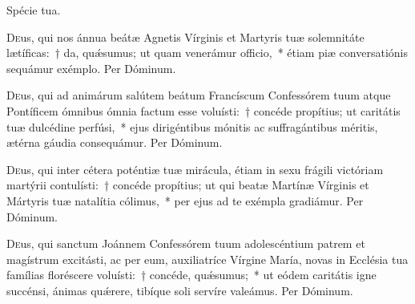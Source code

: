 \documentclass[vesperale_romanum.tex]{subfiles}
\begin{document}
\vv Spécie tua.

\oratio

 \lettrine{D}{e}us, qui nos ánnua beátæ Agnetis Vírginis et Martyris tuæ sole\-mnitáte lætíficas:~† da, quǽsumus; ut quam venerámur officio,~* étiam piæ conversatiónis sequámur exémplo.
Per Dóminum.

\capitdeseq

\myrule


\duplexmtv


\oratio

\lettrine{D}{e}us, qui ad animárum salútem beátum Francíscum Confessórem tuum atque Pontíficem ómnibus ómnia factum esse voluísti:~† concéde propítius; ut caritátis tuæ dulcédine perfúsi,~* ejus dirigéntibus mónitis ac suffragántibus méritis, ætérna gáudia consequámur.
Per Dóminum.


\commsequentis

\myrule


\semiduplex


\oratio

\lettrine{D}{e}us, qui inter cétera poténtiæ tuæ mirácula, étiam in sexu frágili vi\-ctóriam martýrii contulísti:~† concéde propítius; ut qui beatæ Martínæ Vírginis et Mártyris tuæ natalítia cólimus,~* per ejus ad te exémpla gradiámur. Per Dóminum.





\vespsequentiscomm

\myrule
\newpage


\duplex

\oratio

\lettrine{D}{e}us, qui sanctum Joánnem Confessórem tuum adolescéntium patrem et magístrum excitásti, ac per eum, auxiliatríce Vírgine María, novas in Ecclésia tua famílias floréscere voluísti:~† concéde, quǽsumus;~* ut eódem caritátis igne succénsi, ánimas quǽrere, tibíque soli servíre valeámus.
Per Dóminum.
 

\capitdeseq

\myrule
\end{document}
